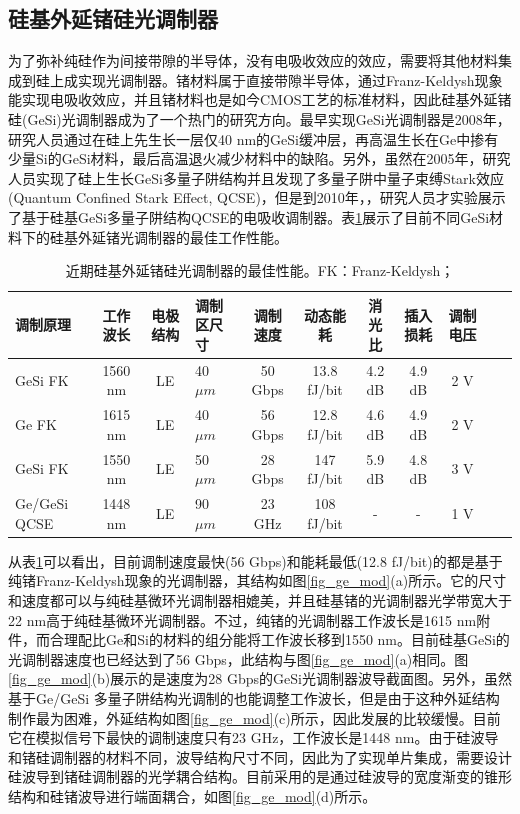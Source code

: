 \subsection{硅基外延锗硅光调制器}
为了弥补纯硅作为间接带隙的半导体，没有电吸收效应的效应，需要将其他材料集成到硅上成实现光调制器。锗材料属于直接带隙半导体，通过Franz-Keldysh现象能实现电吸收效应\cite{frova1965franz}，并且锗材料也是如今CMOS工艺的标准材料，因此硅基外延锗硅(GeSi)光调制器成为了一个热门的研究方向。最早实现GeSi光调制器是2008年\cite{liu2008waveguide}，研究人员通过在硅上先生长一层仅40 nm的GeSi缓冲层，再高温生长在Ge中掺有少量Si的GeSi材料，最后高温退火减少材料中的缺陷。另外，虽然在2005年，研究人员实现了硅上生长GeSi多量子阱结构并且发现了多量子阱中量子束缚Stark效应(Quantum Confined Stark Effect, QCSE)\cite{kuo2005strong}，但是到2010年，，研究人员才实验展示了基于硅基GeSi多量子阱结构QCSE的电吸收调制器\cite{rong2010quantum}。表\ref{sil_ge_mod}展示了目前不同GeSi材料下的硅基外延锗光调制器的最佳工作性能。
{
	\begin{table}[htb]
		\caption{近期硅基外延锗硅光调制器的最佳性能。FK：Franz-Keldysh；}
		\label{sil_ge_mod}
		\centering
		\begin{tabular}[t]{p{1.5cm}ccp{1.2cm}ccccccc}
			\hline
			调制原理 & 工作波长 & 电极结构 & 调制区尺寸 & 调制速度 & 动态能耗 & 消光比 & 插入损耗 & 调制电压\\
			\hline
			GeSi FK\cite{srinivasan201650gb} & 1560 nm & LE & 40 $\mu m$ &  50 Gbps & 13.8 fJ/bit & 4.2 dB&4.9 dB&2 V\\
			Ge FK\cite{Srinivasan201656} & 1615 nm & LE  & 40 $\mu m$ & 56 Gbps & 12.8 fJ/bit & 4.6 dB & 4.9 dB& 2 V\\
			GeSi FK\cite{Dazeng2013high} & 1550 nm & LE  & 50 $\mu m$ & 28 Gbps & 147 fJ/bit & 5.9 dB & 4.8 dB& 3 V\\
			Ge/GeSi QCSE\cite{chaisakul201223} & 1448 nm & LE & 90 $\mu m$ & 23 GHz & 108 fJ/bit & - & - & 1 V\\
			\hline
		\end{tabular}
	\end{table}
}

从表\ref{sil_ge_mod}可以看出，目前调制速度最快(56 Gbps)和能耗最低(12.8 fJ/bit)的都是基于纯锗Franz-Keldysh现象的光调制器，其结构如图\ref{fig_ge_mod}(a)所示。它的尺寸和速度都可以与纯硅基微环光调制器相媲美，并且硅基锗的光调制器光学带宽大于22 nm高于纯硅基微环光调制器\cite{Srinivasan201656}。不过，纯锗的光调制器工作波长是1615 nm附件，而合理配比Ge和Si的材料的组分能将工作波长移到1550 nm。目前硅基GeSi的光调制器速度也已经达到了56 Gbps\cite{srinivasan201650gb}，此结构与图\ref{fig_ge_mod}(a)相同。图\ref{fig_ge_mod}(b)展示的是速度为28 Gbps的GeSi光调制器波导截面图。另外，虽然基于Ge/GeSi 多量子阱结构光调制的也能调整工作波长，但是由于这种外延结构制作最为困难，外延结构如图\ref{fig_ge_mod}(c)所示，因此发展的比较缓慢。目前它在模拟信号下最快的调制速度只有23 GHz，工作波长是1448 nm。由于硅波导和锗硅调制器的材料不同，波导结构尺寸不同，因此为了实现单片集成，需要设计硅波导到锗硅调制器的光学耦合结构。目前采用的是通过硅波导的宽度渐变的锥形结构和硅锗波导进行端面耦合，如图\ref{fig_ge_mod}(d)所示。

